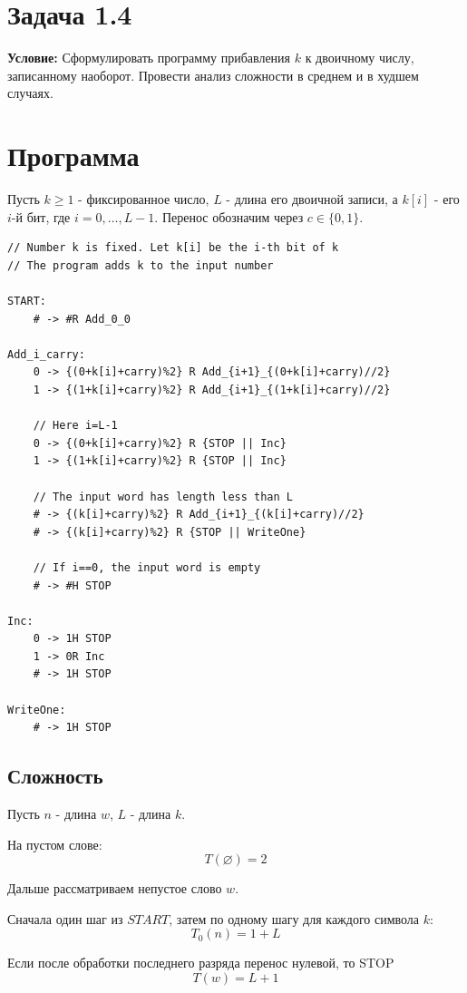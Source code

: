 \documentclass[12pt]{article}
\begin{document}
\section*{Задача 1.4}

\textbf{Условие:} Сформулировать программу прибавления $k$
к двоичному числу, записанному наоборот. Провести анализ
сложности в среднем и в худшем случаях.

\section*{Программа}

Пусть $k\geq 1$ - фиксированное число, $L$ - длина
его двоичной записи, а $k[i]$ - его $i$-й бит,
где $i=0,\ldots,L-1$. Перенос обозначим через
$c\in\{0,1\}$.

\begin{verbatim}
// Number k is fixed. Let k[i] be the i-th bit of k
// The program adds k to the input number

START:
    # -> #R Add_0_0

Add_i_carry:
    0 -> {(0+k[i]+carry)%2} R Add_{i+1}_{(0+k[i]+carry)//2}
    1 -> {(1+k[i]+carry)%2} R Add_{i+1}_{(1+k[i]+carry)//2}

    // Here i=L-1
    0 -> {(0+k[i]+carry)%2} R {STOP || Inc}
    1 -> {(1+k[i]+carry)%2} R {STOP || Inc}

    // The input word has length less than L
    # -> {(k[i]+carry)%2} R Add_{i+1}_{(k[i]+carry)//2}
    # -> {(k[i]+carry)%2} R {STOP || WriteOne}

    // If i==0, the input word is empty
    # -> #H STOP

Inc:
    0 -> 1H STOP
    1 -> 0R Inc
    # -> 1H STOP

WriteOne:
    # -> 1H STOP
\end{verbatim}

\subsection*{Сложность}

Пусть $n$ - длина $w$, $L$ - длина $k$.

На пустом слове:
\[
T(\varnothing)=2
\]

Дальше рассматриваем непустое слово $w$.


Сначала один шаг из $START$, затем по одному
шагу для каждого символа $k$:
\[
T_0(n)=1+L
\]

Если после обработки последнего разряда перенос нулевой,
то STOP
\[
T(w)=L+1
\]
\end{document}
